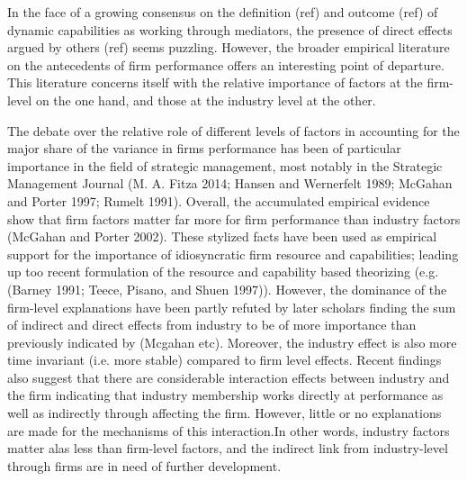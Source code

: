 
In the face of a growing consensus on the definition (ref) and outcome (ref) of dynamic
capabilities as working through mediators, the presence of direct effects argued by others
(ref) seems puzzling. However, the broader empirical literature on the antecedents of firm
performance offers an interesting point of departure. This literature concerns itself with
the relative importance of factors at the firm-level on the one hand, and those at the
industry level at the other. 

The debate over the relative role of different levels of factors in accounting for the
major share of the variance in firms performance has been of particular importance in the
field of strategic management, most notably in the Strategic Management Journal
(M. A. Fitza 2014; Hansen and Wernerfelt 1989; McGahan and Porter 1997; Rumelt
1991). Overall, the accumulated empirical evidence show that firm factors matter far more
for firm performance than industry factors (McGahan and Porter 2002). These stylized facts
have been used as empirical support for the importance of idiosyncratic firm resource and
capabilities; leading up too recent formulation of the resource and capability based
theorizing (e.g. (Barney 1991; Teece, Pisano, and Shuen 1997)). However, the dominance of
the firm-level explanations have been partly refuted by later scholars finding the sum of
indirect and direct effects from industry to be of more importance than previously
indicated by (Mcgahan etc). Moreover, the industry effect is also more time invariant
(i.e. more stable) compared to firm level effects. Recent findings also suggest that there
are considerable interaction effects between industry and the firm indicating that
industry membership works directly at performance as well as indirectly through affecting
the firm. However, little or no explanations are made for the mechanisms of this
interaction.In other words, industry factors matter alas less than firm-level factors, and
the indirect link from industry-level through firms are in need of further development.

